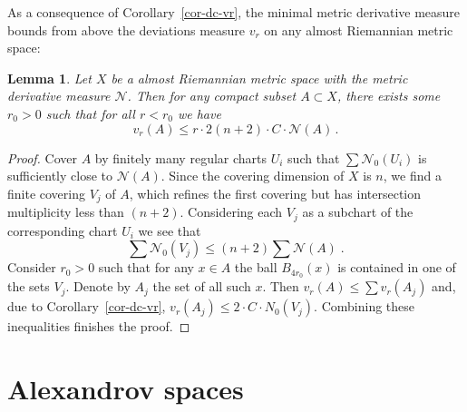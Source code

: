 \documentclass[12pt,leqno,intlimits]{amsart}
\numberwithin{equation}{section}
\newtheorem{lem}[thm]{Lemma}
\theoremstyle{definition}
\theoremstyle{remark}
\newcommand{\cref}[1]{Corollary~\ref{#1}}
\begin{document}
As a consequence of \cref{cor-dc-vr}, the minimal metric derivative measure bounds from above the deviations measure $v_r$
on any almost Riemannian metric space:





\begin{lem} \label{cor-mu-dc}
Let $X$ be a almost Riemannian metric space with the metric derivative measure $\mathcal N$.
Then for any compact subset $A\subset X$, there exists some $r_0>0$ such that for all
$r<r_0$ we have $$v_r (A) \leq r\cdot 2  (n+2)\cdot C\cdot \mathcal N (A)\,. $$
\end{lem}


\begin{proof}
Cover $A$ by finitely many regular charts $U_i$ such that $\sum \mathcal N_0 (U_i)$ is sufficiently close to $\mathcal N (A)$.
Since the covering dimension of $X$ is $n$, we find   a finite covering $V_j$ of $A$, which refines  the first covering but has intersection multiplicity less than $(n+2)$.  Considering each $V_j$ as a subchart of the corresponding chart $U_i$ we see that
 $$\sum \mathcal N_0 (V_j) \leq (n+2) \sum \mathcal N(A) \; .$$
Consider $r_0>0$ such that for any $x\in A$ the ball $B_{4r_0} (x)$ is contained in one of the sets $V_j$.   Denote by $A_j$ the set of all such $x$.
 Then  $v_r (A) \leq \sum v_r (A_j)$ and, due to \cref{cor-dc-vr},  $v_r (A_j) \leq  2 \cdot C\cdot N_0 (V_j)$.
   Combining these  inequalities finishes the proof.
\end{proof}















\section{Alexandrov spaces} \label{sec:Alex}
\end{document}
